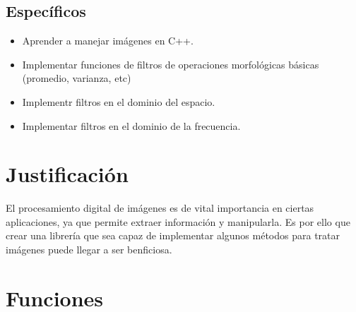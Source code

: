 \documentclass[letterpaper]{article}
\begin{document}
	\subsection{Específicos}

		\begin{itemize}
     
        	\item{Aprender a manejar imágenes en C++.}

			\item{Implementar funciones de filtros de operaciones morfológicas básicas (promedio, varianza, etc)}

			\item{Implementr filtros en el dominio del espacio.}
            
            \item{Implementar filtros en el dominio de la frecuencia.}

		\end{itemize}

\section{Justificación}

El procesamiento digital de imágenes es de vital importancia en ciertas aplicaciones, ya que permite extraer información y manipularla. Es por ello que crear una librería que sea capaz de implementar algunos métodos para tratar imágenes puede llegar a ser benficiosa.

\section{Funciones}
\end{document}

